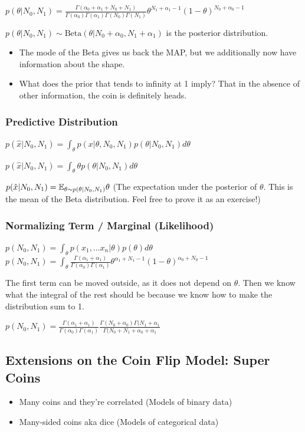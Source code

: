 \documentclass{article}
\begin{document}
$p(\theta|N_0,N_1) = \frac{\Gamma(\alpha_0 + \alpha_1 + N_0 + N_1)}{\Gamma(\alpha_0)\Gamma(\alpha_1)\Gamma(N_0)\Gamma(N_1)} \theta^{N_1 + \alpha_1-1} (1-\theta)^{N_0 + \alpha_0-1} $ 

$p(\theta|N_0,N_1) \sim \textrm{Beta}(\theta | N_0 + \alpha_0, N_1 + \alpha_1)$ is the posterior distribution.

\begin{itemize}
\item The mode of the Beta gives us back the MAP, but we additionally now have information about the shape.
\item What does the prior that tends to infinity at 1 imply? That in the absence of other information, the coin is definitely heads. 
\end{itemize}

\subsubsection*{Predictive Distribution}

$p(\hat{x}| N_0, N_1) = \int_\theta p(x|\theta, N_0, N_1) p(\theta | N_0, N_1) d\theta$

$p(\hat{x}| N_0, N_1) = \int_\theta \theta p(\theta | N_0, N_1) d\theta$

$p(\hat{x}| N_0, N_1) = \mathbb{E}_{\theta \sim p(\theta|N_0, N_1)} \theta$ (The expectation under the posterior of $\theta$. This is the mean of the Beta distribution. Feel free to prove it as an exercise!)

\subsubsection*{Normalizing Term / Marginal (Likelihood)}
$p(N_0, N_1) = \int_\theta p(x_1, \hdots x_n | \theta) p(\theta) d\theta$ \\
$p(N_0, N_1) = \int_\theta \frac{\Gamma( \alpha_1 +  \alpha_1)}{\Gamma(\alpha_0)\Gamma(\alpha_1)} \theta^{\alpha_1 + N_1 -1} (1-\theta)^{\alpha_0+N_0-1} $

The first term can be moved outside, as it does not depend on $\theta$. Then we know what the integral of the rest should be because we know how to make the distribution sum to 1.

$p(N_0, N_1) = \frac{\Gamma( \alpha_1 +  \alpha_1)}{\Gamma(\alpha_0)\Gamma(\alpha_1)} \frac{\Gamma(N_0 + \alpha_0)\Gamma(N_1 + \alpha_1}{\Gamma(N_0 + N_1 + \alpha_0 + \alpha_1}$

\subsection{Extensions on the Coin Flip Model: Super Coins}
\begin{itemize}
\item Many coins and they're correlated (Models of binary data)
\item Many-sided coins aka dice (Models of categorical data)
\end{itemize}
\end{document}
